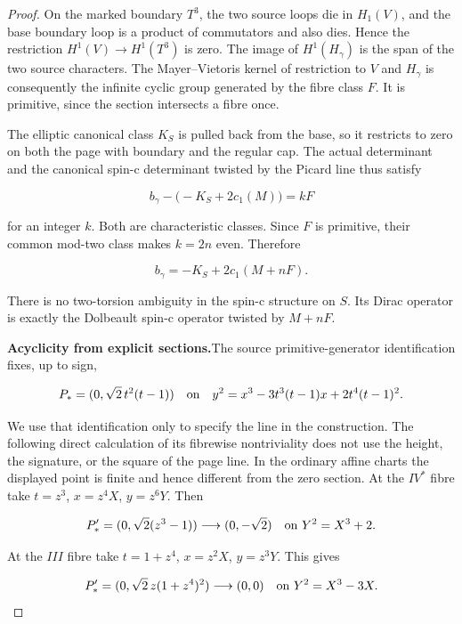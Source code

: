 \begin{proof}
On the marked boundary \(T^3\), the two source loops die in
\(H_1(V)\), and the base boundary loop is a product of
commutators and also dies.  Hence the restriction
\(H^1(V)\to H^1(T^3)\) is zero.  The image of
\(H^1(H_\gamma)\) is the span of the two source characters.
The Mayer–Vietoris kernel of restriction to \(V\) and
\(H_\gamma\) is consequently the infinite cyclic group generated
by the fibre class \(F\).  It is primitive, since the section
intersects a fibre once.

The elliptic canonical class \(K_S\) is pulled back from the base,
so it restricts to zero on both the page with boundary and the
regular cap.  The actual determinant and the canonical spin-c
determinant twisted by the Picard line thus satisfy

\[
 b_\gamma-\bigl(-K_S+2c_1(M)\bigr)=kF
\]

for an integer \(k\).  Both are characteristic classes.  Since
\(F\) is primitive, their common mod-two class makes \(k=2n\)
even.  Therefore

\[
 b_\gamma=-K_S+2c_1(M+nF).
\]

There is no two-torsion ambiguity in the spin-c structure on
\(S\).  Its Dirac operator is exactly the Dolbeault spin-c
operator twisted by \(M+nF\).

\par\medskip\noindent\textbf{Acyclicity from explicit sections.}\enspace The source
primitive-generator identification fixes, up to sign,

\[
 P_*=(0,\sqrt2\,t^2(t-1))
 \quad\hbox{on}\quad
 y^2=x^3-3t^3(t-1)x+2t^4(t-1)^2.
\]

We use that identification only to specify the line in the
construction.  The following direct calculation of its fibrewise
nontriviality does not use the height, the signature, or the square
of the page line.  In the ordinary affine charts the displayed
point is finite and hence different from the zero section.  At the
\(IV^*\) fibre take \(t=z^3\), \(x=z^4X\), \(y=z^6Y\).
Then

\[
 P'_*=(0,\sqrt2(z^3-1))\longrightarrow(0,-\sqrt2)
 \quad\hbox{on }Y^2=X^3+2.
\]

At the \(III\) fibre take \(t=1+z^4\), \(x=z^2X\),
\(y=z^3Y\).  This gives

\[
 P'_*=(0,\sqrt2\,z(1+z^4)^2)\longrightarrow(0,0)
 \quad\hbox{on }Y^2=X^3-3X.
\]


\end{proof}
